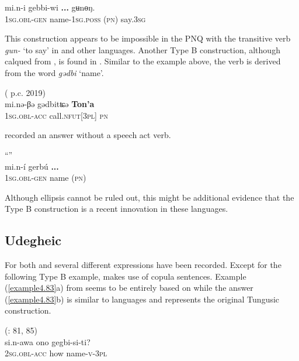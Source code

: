 \documentclass[output=paper,colorlinks,citecolor=brown]{langscibook}
\begin{document}
    \ex
    \gll mi.n-i		gebbi-wi			\textbf{...}			gʉnɵŋ.\\
    1\textsc{sg.obl-gen}	name-1\textsc{sg.poss}		(\textsc{pn})			say.3\textsc{sg}\\
    \z
\z

This construction appears to be impossible in the PNQ with the transitive verb \textit{gun-} ‘to say’ in  and other  languages. Another Type B construction, although calqued from , is found in . Similar to the  example above, the verb is derived from the word \textit{gədbi} ‘name’.

\ea
    \label{example4.81}
     ( p.c. 2019)\\
    \gll mi.nə-βə			gədbitʨə		\textbf{Ton’a}\\
    1\textsc{sg.obl-acc}		call.\textsc{nfut[3pl]}		\textsc{pn}\\
    \z

\noindent \citet{Ivanovskiy1982} recorded an answer without a speech act verb.

\ea
    \label{example4.82}
    ``'' \citep[1]{Ivanovskiy1982}\\
    \gll mi.n-í		gerbú		\textbf{...}\\
    1\textsc{sg.obl-gen}	name		(\textsc{pn})\\
\z

\noindent Although ellipsis cannot be ruled out, this might be additional evidence that the Type B construction is a recent innovation in these languages.


\subsection{Udegheic}\label{section4.4.4}

For both  and  several different expressions have been recorded. Except for the following Type B example,  makes use of copula sentences. Example (\ref{example4.83}a) from  seems to be entirely based on  while the answer (\ref{example4.83}b) is similar to  languages and represents the original Tungusic construction.

\ea
    \label{example4.83}
     (\citealt{Tsumagari2011}: 81, 85)\\
    \ea
    \gll si.n-awa		ono		gegbi-si-ti?\\
    2\textsc{sg.obl-acc}	how		name-\textsc{v-3pl}\\
\end{document}
